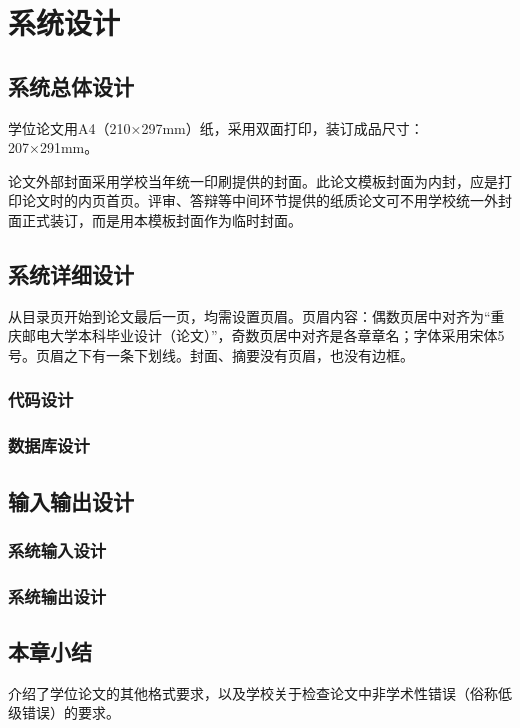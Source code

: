 \chapter{系统设计}

\section{系统总体设计}

学位论文用A4（210×297mm）纸，采用双面打印，装订成品尺寸：207×291mm。

论文外部封面采用学校当年统一印刷提供的封面。此论文模板封面为内封，应是打印论文时的内页首页。评审、答辩等中间环节提供的纸质论文可不用学校统一外封面正式装订，而是用本模板封面作为临时封面。

\section{系统详细设计}

从目录页开始到论文最后一页，均需设置页眉。页眉内容：偶数页居中对齐为“重庆邮电大学本科毕业设计（论文）”，奇数页居中对齐是各章章名；字体采用宋体5号。页眉之下有一条下划线。封面、摘要没有页眉，也没有边框。

\subsection{代码设计}
\subsection{数据库设计}

\section{输入输出设计}
\subsection{系统输入设计}

\subsection{系统输出设计}

\section{本章小结}
介绍了学位论文的其他格式要求，以及学校关于检查论文中非学术性错误（俗称低级错误）的要求。







